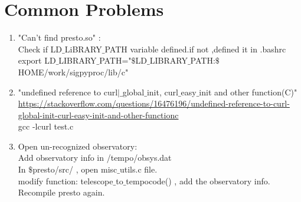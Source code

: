 \documentclass{article}
\begin{document}
\section{Common Problems}
\begin{enumerate}[(1)]
\item "Can't find presto.so" : \\
Check if LD$\_$LiBRARY$\_$PATH variable defined.if not ,defined it in .bashrc \\
export LD$\_$LIBRARY$\_$PATH="$\$$LD$\_$LIBRARY$\_$PATH:$\$$HOME/work/sigpyproc/lib/c"
\item  "undefined reference to curl$|\_$global$\_$init, curl$\_$easy$\_$init and other function(C)" \\
\url{https://stackoverflow.com/questions/16476196/undefined-reference-to-curl-global-init-curl-easy-init-and-other-functionc} \\
gcc -lcurl test.c 
\item Open un-recognized observatory: \\
Add observatory info in /tempo/obsys.dat  \\
In $\$$presto/src/ , open misc$\_$utils.c file.  \\
modify function: telescope$\_$to$\_$tempocode() , add the observatory info.\\
Recompile presto again.

\end{enumerate}
\end{document}
